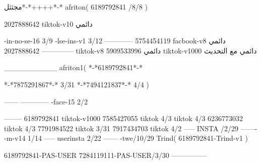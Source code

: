 مجثثل*-*++++*-*
afriton(
6189792841 /8/8
)

2027888642 tiktok-v10
دائمي

-in-no-se-16 3/9
-lse-ins-v1 3/12
------------
5754454119 facbook-v8
دائمي
--------------
2027888642 tiktok-v8
دائمي
5909533996 tiktok-v1000
دائمي مع التحديث

__________
afriton1(
*-*6189792841*-*

*-*7875291867*-* 3/31
*-*7494121837*-* 4/4
)


------
------------
-face-15 2/2

--------
6189792841 tiktok-v1000
7585427055 tiktok 4/3
 tiktok 4/3
6236773032 tiktok 4/3
7791984522 tiktok 3/31
7917434703 tiktok 4/2
-----
 INSTA /2/29
-------
-m-v14 1/14
-----
userinsta 2/22
------
-twe/10/29
Trind(
6189792841-Trind-v1 
)

6189792841-PAS-USER
7284119111-PAS-USER/3/30
    ---------------
